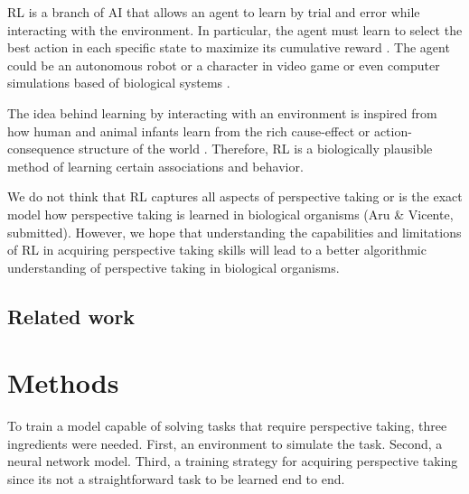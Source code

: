 \documentclass{article}
\begin{document}
RL is a branch of AI that allows an agent to learn by trial and error while interacting with the environment. In particular, the agent must learn to select the best action in each specific state to maximize its cumulative reward \cite{sutton1998reinforcement}. The agent could be an autonomous robot \cite{lin1993reinforcement,yang2004multiagent,riedmiller2009reinforcement} or a character in video game \cite{mnih2013playing,tampuu2017multiagent} or even computer simulations based of biological systems \cite{amigoni2007multiagent}. 

\par 
The idea behind learning by interacting with an environment is inspired from how human and animal infants learn from the rich cause-effect or action-consequence structure of the world \cite{sutton1998reinforcement,thorndike1911animal,schultz1997neural}. Therefore, RL is a biologically plausible method of learning certain associations and behavior. 

We do not think that RL captures all aspects of perspective taking or is the exact model how perspective taking is learned in biological organisms (Aru \& Vicente, submitted). However, we hope that understanding the capabilities and limitations of RL in acquiring perspective taking skills will lead to a better algorithmic understanding of perspective taking in biological organisms.
\subsection{Related work}

\section{Methods}
To train a model capable of solving tasks that require perspective taking, three ingredients were needed. First, an environment to simulate the task. Second, a neural network model. Third, a training strategy for acquiring perspective taking since its not a straightforward task to be learned end to end.
\end{document}
